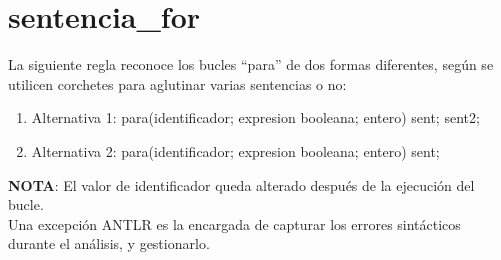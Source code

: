    \section{sentencia\_for}
   La siguiente regla reconoce los bucles ``para'' de dos formas diferentes, según se utilicen corchetes para aglutinar varias
   sentencias o no:
   \begin{enumerate}
      \item Alternativa 1: para(identificador; expresion booleana; entero) { sent; sent2; }
      \item Alternativa 2: para(identificador; expresion booleana; entero) sent; 
   \end{enumerate}
  \textbf{NOTA}: El valor de identificador queda alterado después de la ejecución del bucle.\\
  Una excepción ANTLR es la encargada de capturar los errores sintácticos durante el análisis,  y gestionarlo.
